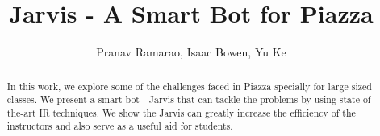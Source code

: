\documentclass[sigconf]{acmart}
\begin{document}
\title{Jarvis - A Smart Bot for Piazza}
\author{Pranav Ramarao, Isaac Bowen, Yu Ke}


\renewcommand{\shortauthors}{B. Trovato et al.}


\begin{abstract}
In this work, we explore some of the challenges faced in Piazza specially for large sized classes. We present a smart bot - Jarvis that can tackle the problems by using state-of-the-art IR techniques. We show the Jarvis can greatly increase the efficiency of the instructors and also serve as a useful aid for students.
\end{abstract}


\maketitle



 
\end{document}
